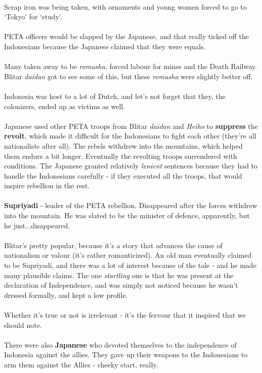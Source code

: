 \documentclass[a4paper]{article}
\begin{document}
\\
Scrap iron was being taken, with ornaments and young women forced to go to `Tokyo' for `study'. \\
\\
PETA officers would be slapped by the Japanese, and that really ticked off the Indonesians because the Japanese claimed that they were equals.\\
\\
Many taken away to be \textit{romusha}, forced labour for mines and the Death Railway. Blitar \textit{daidan} got to see some of this, but these \textit{romusha} were slightly better off.\\
\\
Indonesia was host to a lot of Dutch, and let's not forget that they, the colonizers, ended up as victims as well.\\
\\
Japanese used other PETA troops from Blitar \textit{daidan} and \textit{Heiho} to \textbf{suppress} the \textbf{revolt}, which made it difficult for the Indonesians to fight each other (they're all nationalists after all). The rebels withdrew into the mountains, which helped them endure a bit longer. Eventually the revolting troops surrendered with conditions. The Japanese granted relatively \textit{lenient} sentences because they had to handle the Indonesians carefully - if they executed all the troops, that would inspire rebellion in the rest.\\
\\
\textbf{Supriyadi} - leader of the PETA rebellion. Disappeared after the forces withdrew into the mountain. He was slated to be the minister of defence, apparently, but he just...disappeared.\\
\\
Blitar's pretty popular, because it's a story that advances the cause of nationalism or valour (it's rather romanticized). An old man eventually claimed to be Supriyadi, and there was a lot of interest because of the tale - and he made many plausible claims. The one \textit{startling} one is that he was present at the declaration of Independence, and was simply not noticed because he wasn't dressed formally, and kept a low profile.\\
\\
Whether it's true or not is irrelevant - it's the fervour that it inspired that we should note.\\
\\
There were also \textbf{Japanese} who devoted themselves to the independence of Indonesia against the allies. They gave up their weapons to the Indonesians to arm them against the Allies - cheeky start, really.
\end{document}
